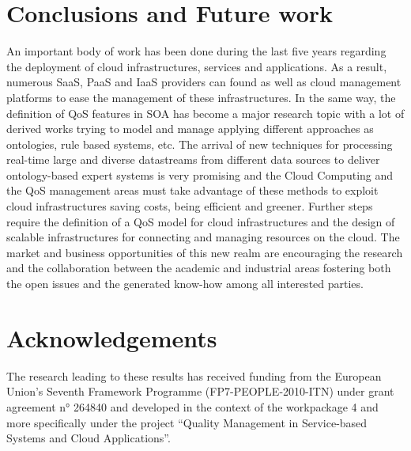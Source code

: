 \section{Conclusions and Future work}\label{sect:conclusions}
An important body of work has been done during the last five years regarding the
deployment of cloud infrastructures, services and applications. As a result,
numerous SaaS, PaaS and IaaS providers can found as well as cloud management
platforms to ease the management of these infrastructures. In the same way, the
definition of QoS features in SOA has become a major research topic with a lot
of derived works trying to model and manage applying different approaches as
ontologies, rule based systems, etc. The arrival of new techniques for
processing real-time large and diverse datastreams from different data sources
to deliver ontology-based expert systems is very promising and the Cloud
Computing and the QoS management areas must take advantage of these methods to exploit cloud
infrastructures saving costs, being efficient and greener. Further steps require
the definition of a QoS model for cloud infrastructures and the design of
scalable infrastructures for connecting and managing resources on the cloud. The
market and business opportunities of this new realm are encouraging the research and the
collaboration between the academic and industrial areas fostering both the open
issues and the generated know-how among all interested parties.

\section{Acknowledgements}\label{sect:ack}
The research leading to these results has received funding from the European Union’s Seventh Framework Programme (FP7-PEOPLE-2010-ITN) 
under grant agreement n° 264840 and developed in the context of the workpackage 4 and more specifically under the project 
``Quality Management in Service-based Systems and Cloud Applications''.

